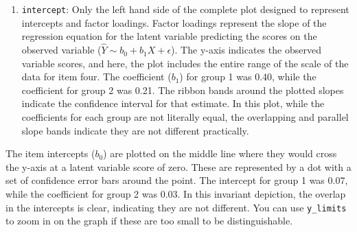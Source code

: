 \documentclass[
  man]{apa7}
\providecommand{\tightlist}{%
  \setlength{\itemsep}{0pt}\setlength{\parskip}{0pt}}
\begin{document}
\begin{enumerate}
\def\labelenumi{\arabic{enumi})}
\setcounter{enumi}{1}
\tightlist
\item
  \texttt{intercept}: Only the left hand side of the complete plot designed to represent intercepts and factor loadings. Factor loadings represent the slope of the regression equation for the latent variable predicting the scores on the observed variable (\(\hat{Y} \sim b_0 + b_1X + \epsilon\)). The y-axis indicates the observed variable scores, and here, the plot includes the entire range of the scale of the data for item four. The coefficient (\(b_1\)) for group 1 was 0.40, while the coefficient for group 2 was 0.21. The ribbon bands around the plotted slopes indicate the confidence interval for that estimate. In this plot, while the coefficients for each group are not literally equal, the overlapping and parallel slope bands indicate they are not different practically.
\end{enumerate}

The item intercepts (\(b_0\)) are plotted on the middle line where they would cross the y-axis at a latent variable score of zero. These are represented by a dot with a set of confidence error bars around the point. The intercept for group 1 was 0.07, while the coefficient for group 2 was 0.03. In this invariant depiction, the overlap in the intercepts is clear, indicating they are not different. You can use \texttt{y\_limits} to zoom in on the graph if these are too small to be distinguishable.
\end{document}
